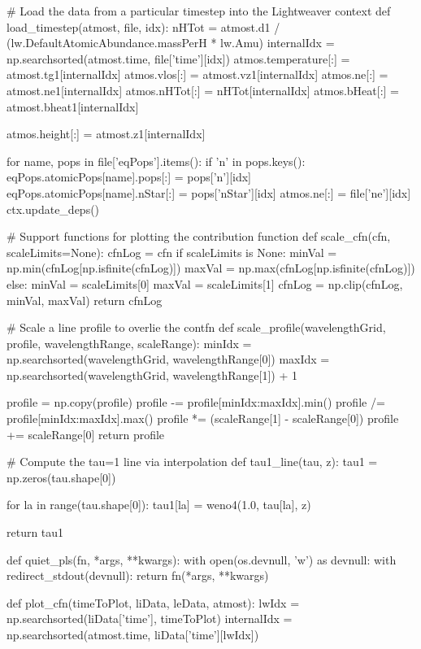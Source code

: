 \begin{pycode}[TimeDepRT]
# Load the data from a particular timestep into the Lightweaver context
def load_timestep(atmost, file, idx):
    nHTot = atmost.d1 / (lw.DefaultAtomicAbundance.massPerH * lw.Amu)
    internalIdx = np.searchsorted(atmost.time, file['time'][idx])
    atmos.temperature[:] = atmost.tg1[internalIdx]
    atmos.vlos[:] = atmost.vz1[internalIdx]
    atmos.ne[:] = atmost.ne1[internalIdx]
    atmos.nHTot[:] = nHTot[internalIdx]
    atmos.bHeat[:] = atmost.bheat1[internalIdx]

    atmos.height[:] = atmost.z1[internalIdx]

    for name, pops in file['eqPops'].items():
        if 'n' in pops.keys():
            eqPops.atomicPops[name].pops[:] = pops['n'][idx]
        eqPops.atomicPops[name].nStar[:] = pops['nStar'][idx]
    atmos.ne[:] = file['ne'][idx]
    ctx.update_deps()

# Support functions for plotting the contribution function
def scale_cfn(cfn, scaleLimits=None):
    cfnLog = cfn
    if scaleLimits is None:
        minVal = np.min(cfnLog[np.isfinite(cfnLog)])
        maxVal = np.max(cfnLog[np.isfinite(cfnLog)])
    else:
        minVal = scaleLimits[0]
        maxVal = scaleLimits[1]
    cfnLog = np.clip(cfnLog, minVal, maxVal)
    return cfnLog

# Scale a line profile to overlie the contfn
def scale_profile(wavelengthGrid, profile, wavelengthRange, scaleRange):
    minIdx = np.searchsorted(wavelengthGrid, wavelengthRange[0])
    maxIdx = np.searchsorted(wavelengthGrid, wavelengthRange[1]) + 1

    profile = np.copy(profile)
    profile -= profile[minIdx:maxIdx].min()
    profile /= profile[minIdx:maxIdx].max()
    profile *= (scaleRange[1] - scaleRange[0])
    profile += scaleRange[0]
    return profile

# Compute the tau=1 line via interpolation
def tau1_line(tau, z):
    tau1 = np.zeros(tau.shape[0])

    for la in range(tau.shape[0]):
        tau1[la] = weno4(1.0, tau[la], z)

    return tau1

def quiet_pls(fn, *args, **kwargs):
    with open(os.devnull, 'w') as devnull:
        with redirect_stdout(devnull):
            return fn(*args, **kwargs)

def plot_cfn(timeToPlot, liData, leData, atmost):
    lwIdx = np.searchsorted(liData['time'], timeToPlot)
    internalIdx = np.searchsorted(atmost.time, liData['time'][lwIdx])


\end{pycode}
